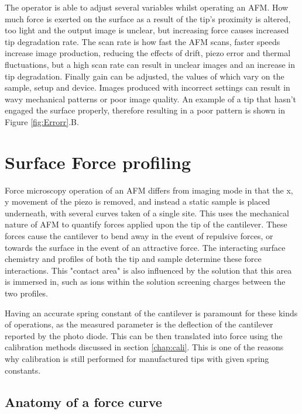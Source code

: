 The operator is able to adjust several variables whilst operating an AFM. How much force is exerted on the surface as a result of the tip's proximity is altered, too light and the output image is unclear, but  increasing force causes increased tip degradation rate. The scan rate is how fast the AFM scans, faster speeds increase image production, reducing the effects of drift, piezo error and thermal fluctuations, but a high scan rate can result in unclear images and an increase in tip degradation. Finally gain can be adjusted, the values of which vary on the sample, setup and device. Images produced with incorrect settings can result in wavy mechanical patterns or poor image quality. An example of a tip that hasn't engaged the surface properly, therefore resulting in a poor pattern is shown in Figure \ref{fig:Errorr}.B. \cite{AFMBook2, AFMBook1}

\section{Surface Force profiling}

Force microscopy operation of an AFM differs from imaging mode in that the x, y movement of the piezo is removed, and instead a static sample is placed underneath, with several curves taken of a single site. This uses the mechanical nature of AFM to quantify forces applied upon the tip of the cantilever. These forces cause the cantilever to bend away in the event of repulsive forces, or towards the surface in the event of an attractive force. The interacting surface chemistry and profiles of both the tip and sample determine these force interactions. This "contact area" is also influenced by the solution that this area is immersed in, such as ions within the solution screening charges between the two profiles.

Having an accurate spring constant of the cantilever is paramount for these kinds of operations, as the measured parameter is the deflection of the cantilever reported by the photo diode. This can be then translated into force using the calibration methods discussed in section \ref{chap:cali}. This is one of the reasons why calibration is still performed for manufactured tips with given spring constants.

\subsection{Anatomy of a force curve}

